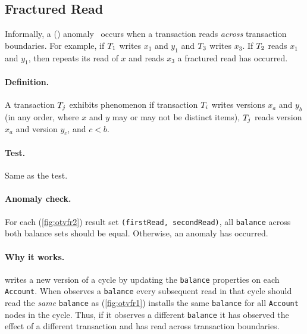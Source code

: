 \subsection{Fractured Read}
\label{sec:fractured-reads}

Informally, a  () 
anomaly~\cite{DBLP:journals/tods/BailisFGHS16} occurs when a transaction reads 
\emph{across} transaction boundaries. For example, if $T_1$ writes $x_1$ 
and $y_1$ and $T_3$ writes $x_3$. If $T_2$ reads $x_1$ and $y_1$, then 
repeats its read of $x$ and reads $x_3$ a fractured read has occurred.

\paragraph{Definition.}
A transaction $T_j$ exhibits phenomenon  if transaction 
$T_i$ writes versions $x_a$ and $y_b$ (in any order, where $x$ and $y$ may 
or may not be distinct items), $T_j$ reads version $x_a$ and version $y_c$, 
and $c < b$.

\paragraph{Test.}
Same as the  test.

\paragraph{Anomaly check.}
For each   (\autoref{fig:otvfr2}) result set 
\texttt{(firstRead, secondRead)}, all \texttt{balance} across both balance sets 
should be equal. Otherwise, an  anomaly has occurred.

\paragraph{Why it works.}
 writes a new version of a cycle by updating the 
\texttt{balance} properties on each \texttt{Account}. When  
observes a \texttt{balance} every subsequent read in that cycle should read the 
\emph{same} \texttt{balance} as  (\autoref{fig:otvfr1}) 
installs the same \texttt{balance} for all \texttt{Account} nodes in the cycle.
Thus, if it observes a different \texttt{balance} it has observed the effect of 
a different transaction and has read across transaction boundaries.


